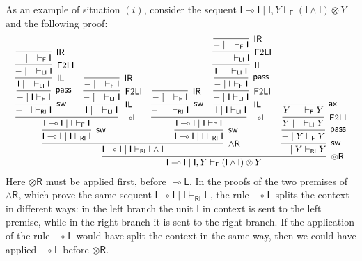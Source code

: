 \documentclass[submission,copyright,creativecommons]{eptcs}
\theoremstyle{definition}
\newcommand{\tr}{\otimes \mathsf{R}}
\newcommand{\lleft}{{\multimap}\mathsf{L}}
\newcommand{\pass}{\mathsf{pass}}
\newcommand{\unitl}{\mathsf{IL}}
\newcommand{\unitr}{\mathsf{IR}}
\newcommand{\andr}{\land \mathsf{R}}
\newcommand{\ax}{\mathsf{ax}}
\newcommand{\ot}{\otimes}
\newcommand{\lolli}{\multimap}
\newcommand{\I}{\mathsf{I}}
\newcommand{\RI}{\mathsf{RI}}
\newcommand{\LI}{\mathsf{LI}}
\newcommand{\F}{\mathsf{F}}
\newcommand{\sw}{\mathsf{sw}}
\begin{document}
As an example of situation $(i)$, consider the sequent $\I \lolli \I \mid \I , Y \vdash_\F (\I \land \I) \ot Y$ and the following proof:
\begin{equation}\label{eq:ex:lleft:NonDeter}
  \small
  \begin{array}{c}
    \infer[\tr]{\I \lolli \I \mid \I , Y \vdash_\F (\I \land \I) \ot Y}{
      \infer[\andr]{\I \lolli \I \mid \I \vdash_\RI \I \land \I}{
  \infer[\sw]{\I \lolli \I \mid \I \vdash_\RI \I}{
    \infer[\lleft]{\I \lolli \I \mid \I \vdash_\F \I}{
      \infer[\sw]{- \mid \I \vdash_\RI \I}{
      \infer[\pass]{- \mid \I \vdash_\F \I}{
        \infer[\unitl]{\I \mid \quad \vdash_\LI \I}{
          \infer[\F 2 \LI]{- \mid \quad \vdash_\LI \I}{
          \infer[\unitr]{- \mid \quad \vdash_\F \I}{}}
        }
      }}
      &
      \infer[\unitl]{\I \mid \quad \vdash_\LI \I}{
        \infer[\F 2 \LI]{- \mid \quad \vdash_\LI \I}{
        \infer[\unitr]{- \mid \quad \vdash_\F \I}{}
      }}
    }
      }        
    &
   \infer[\sw]{\I \lolli \I \mid \I \vdash_\RI \I}{
        \infer[\lleft]{\I \lolli \I \mid \I \vdash_\F \I}{
      \infer[\sw]{- \mid \quad \vdash_\RI \I}{
      \infer[\unitr]{- \mid \quad \vdash_\F \I}{}}
      &
      \infer[\unitl]{\I \mid \I \vdash_\LI \I}{
        \infer[\F 2 \LI]{- \mid \I \vdash_\LI \I}{
        \infer[\pass]{- \mid \I \vdash_\F \I}{
          \infer[\unitl]{\I \mid \quad \vdash_\LI \I}{
            \infer[\F 2 \LI]{- \mid \quad \vdash_\LI \I}{
            \infer[\unitr]{- \mid \quad \vdash_\F \I}{}}
          }
        }
      }
    }}}}    
      &
      \infer[\sw]{- \mid Y \vdash_\RI Y}{
      \infer[\pass]{- \mid Y \vdash_\F Y}{
        \infer[\F 2 \LI]{Y \mid \quad \vdash_\LI Y}{
        \infer[\ax]{Y \mid \quad \vdash_\F Y}{}}
      }}
    }
  \end{array}
\end{equation}
Here $\tr$ must be applied first, before $\lleft$. In the proofs of the two premises of $\andr$, which prove the same sequent $\I \lolli \I \mid \I \vdash_\RI \I$ , the rule $\lleft$ splits the context in different ways: in the left branch the unit $\I$ in context is sent to the left premise, while in the right branch it is sent to the right branch. If the application of the rule $\lleft$ would have split the context in the same way, then we could have applied $\lleft$ before $\tr$.
\end{document}
